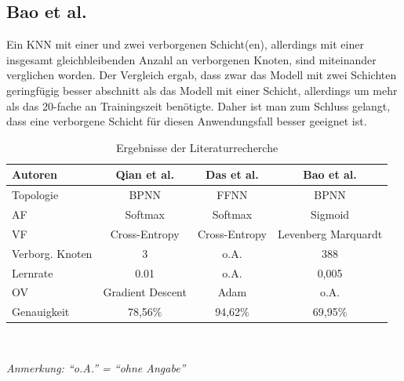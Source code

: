 \documentclass{scrartcl}
\begin{document}
\subsection{Bao et al.}
Ein KNN mit einer und zwei verborgenen Schicht(en), allerdings mit einer insgesamt
gleichbleibenden Anzahl an verborgenen Knoten, sind miteinander verglichen worden.
Der Vergleich ergab, dass zwar das Modell mit zwei Schichten geringfügig besser abschnitt
als das Modell mit einer Schicht, allerdings um mehr als das 20-fache an Trainingszeit
benötigte. Daher ist man zum Schluss gelangt, dass eine verborgene Schicht für diesen
Anwendungsfall besser geeignet ist.


\begin{table}[h!]
   \centering
   \caption{Ergebnisse der Literaturrecherche}
   \begin{tabular}{lccc} \toprule
      Autoren         & Qian et al. \cite{qian} & Das et al.  \cite{das} & Bao et al. \cite{bao} \\ \midrule
      Topologie       & BPNN                    & FFNN                   & BPNN                  \\
      AF              & Softmax                 & Softmax                & Sigmoid               \\
      VF              & Cross-Entropy           & Cross-Entropy          & Levenberg Marquardt   \\
      Verborg. Knoten & $3$                     & o.A.                   & $388$                 \\
      Lernrate        & 0.01                    & o.A.                   & 0,005                 \\
      OV              & Gradient Descent        & Adam                   & o.A.                  \\
      Genauigkeit     & 78,56\%                 & 94,62\%                & 69,95\%               \\
      \bottomrule
   \end{tabular}
   \label{tab1}
   \medskip \\
   {\raggedright \textit{Anmerkung: \enquote{o.A.} = \enquote{ohne Angabe}} \par}
\end{table}
\end{document}
